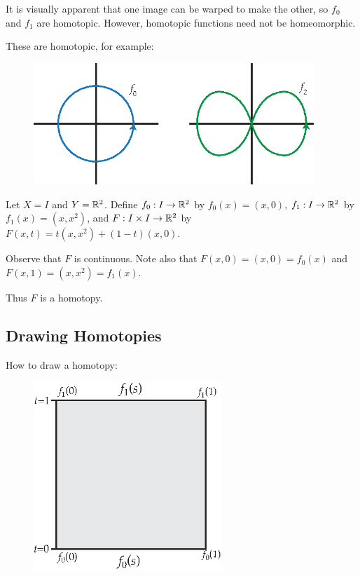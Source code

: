 It is visually apparent that one image can be warped to make the other, so $f_0$ and $f_1$ are homotopic. However, homotopic functions need not be homeomorphic. 

These are homotopic, for example:
\begin{figure}[ht!]
    \centering
    \includegraphics[width=300pt]{images/homotopy/circle_and_infty}
\end{figure}
 
\begin{example}
	Let $X = I$ and $Y = \mathbb R^2$. Define $f_0: I \rightarrow \mathbb R^2$ by $f_0(x) = (x,0)$, $f_1: I \rightarrow \mathbb R^2$ by $f_1(x) = (x,x^2)$, and $F: I \times I \rightarrow \mathbb R^2$ by $F(x, t) = t(x, x^2) + (1-t)(x, 0)$.
	
	Observe that $F$ is continuous. Note also that $F(x,0) = (x, 0) = f_0(x)$ and $F(x,1) = (x, x^2) = f_1(x)$.
	
	Thus $F$ is a homotopy. 
\end{example}

\subsection{Drawing Homotopies}

How to draw a homotopy: 
\begin{figure}[ht!]
    \centering
    \includegraphics[width=200pt]{images/homotopy/how_to_homotope}
\end{figure}

